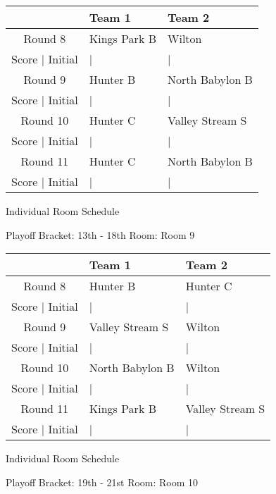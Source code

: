 \documentclass{article}%
\begin{document}
%
\begin{tabularx}{\textwidth}{|c|Y|Y|}%
\hline%
&Team 1&Team 2\\%
\hline%
Round 8&Kings Park B&Wilton\\%
\hline%
Score | Initial&|&|\\%
\hline%
Round 9&Hunter B&North Babylon B\\%
\hline%
Score | Initial&|&|\\%
\hline%
Round 10&Hunter C&Valley Stream S\\%
\hline%
Score | Initial&|&|\\%
\hline%
Round 11&Hunter C&North Babylon B\\%
\hline%
Score | Initial&|&|\\%
\hline%
\end{tabularx}%
\vspace*{16pt}%
\linebreak%
\newpage%
\begin{center}%
\begin{Huge}%
Individual Room Schedule%
\end{Huge}%
\vspace*{16pt}%
\linebreak%
\begin{Large}%
Playoff Bracket: 13th - 18th \hfill Room: Room 9%
\end{Large}%
\end{center}%
%
\begin{tabularx}{\textwidth}{|c|Y|Y|}%
\hline%
&Team 1&Team 2\\%
\hline%
Round 8&Hunter B&Hunter C\\%
\hline%
Score | Initial&|&|\\%
\hline%
Round 9&Valley Stream S&Wilton\\%
\hline%
Score | Initial&|&|\\%
\hline%
Round 10&North Babylon B&Wilton\\%
\hline%
Score | Initial&|&|\\%
\hline%
Round 11&Kings Park B&Valley Stream S\\%
\hline%
Score | Initial&|&|\\%
\hline%
\end{tabularx}%
\vspace*{16pt}%
\linebreak%
\newpage%
\begin{center}%
\begin{Huge}%
Individual Room Schedule%
\end{Huge}%
\vspace*{16pt}%
\linebreak%
\begin{Large}%
Playoff Bracket: 19th - 21st \hfill Room: Room 10%
\end{Large}%
\end{center}%
\end{document}
